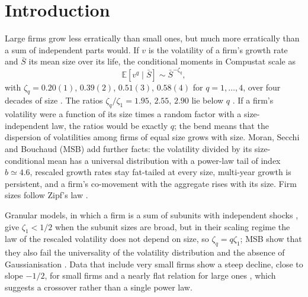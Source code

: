 \documentclass[pre,twocolumn,superscriptaddress,nofootinbib]{revtex4-2}
\newcommand{\E}{\mathbb E}
\newcommand{\Sb}{\bar S}
\begin{document}
\maketitle

\section{Introduction}
\label{sec:intro}

Large firms grow less erratically than small ones, but much more erratically than a sum of
independent parts would.  If $v$ is the volatility of a firm's growth rate and $\Sb$ its mean size
over its life, the conditional moments in Compustat scale as
\begin{equation}
\E[v^q\mid\Sb]\sim\Sb^{-\zeta_q},
\label{eq:zeta}
\end{equation}
with $\zeta_q=0.20(1)$, $0.39(2)$, $0.51(3)$, $0.58(4)$ for $q=1,\dots,4$,
over four decades of size \cite{stanley1996,amaral1997,sutton2002,moran2024}.  The ratios
$\zeta_q/\zeta_1=1.95$, $2.55$, $2.90$ lie below $q$ \cite{moran2024}.  If a firm's volatility were a
function of its size times a random factor with a size-independent law, the ratios would be exactly
$q$; the bend means that the dispersion of volatilities among firms of equal size grows with size.
Moran, Secchi and Bouchaud \cite{moran2024} (MSB) add further facts: the volatility divided by its
size-conditional mean has a universal distribution with a power-law tail of index $b\simeq4.6$,
rescaled growth rates stay fat-tailed at every size, multi-year growth is persistent, and a firm's
co-movement with the aggregate rises with its size.  Firm sizes follow Zipf's law \cite{axtell2001}.

Granular models, in which a firm is a sum of subunits with independent shocks
\cite{wyartbouchaud2003,gabaix2011}, give $\zeta_1<1/2$ when the subunit sizes are broad, but in
their scaling regime the law of the rescaled volatility does not depend on size, so
$\zeta_q=q\zeta_1$; MSB show that they also fail the universality of the volatility distribution and
the absence of Gaussianisation \cite{moran2024}.  Data that include very small firms show a steep
decline, close to slope $-1/2$, for small firms and a nearly flat relation for large ones
\cite{fontanelli2025}, which suggests a crossover rather than a single power law.
\end{document}
